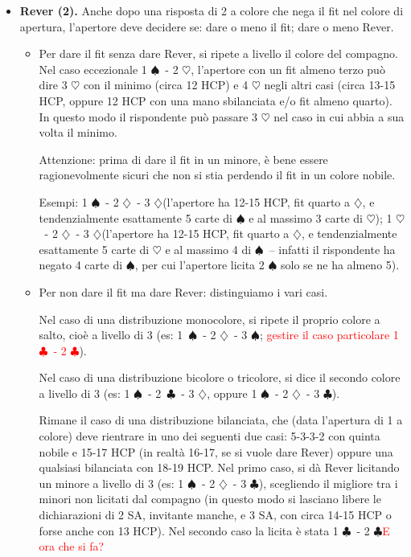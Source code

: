 \documentclass[a4paper,10pt]{article}
\renewcommand{\c}{$\clubsuit$\xspace}
\renewcommand{\d}{$\diamondsuit$\xspace}
\newcommand{\h}{$\heartsuit$\xspace}
\newcommand{\s}{$\spadesuit$\xspace}
\newcommand{\sa}{SA\xspace}
\newcommand{\note}[1]{\textcolor{red}{#1}}
\begin{document}
\begin{itemize}
 Altro esempio: se l'apertore ha meno di 16 HCP, 6 carte di \h e 5 carte di \s, su 1 \h\ - 1 \sa deve rispondere 2 \h e non 2 \s. Questo è un po' triste, però non ci si può fare nulla.
 
 Ulteriore esempio: su 1 \d\ - 1 \s, con la distribuzione 4\d\ - 4\h\ - 3\s\ - 2\c e meno di 16 HCP, l'apertore licita 1 \sa e non 2 \h.
 
 \item {\bf Rever (2).} Anche dopo una risposta di 2 a colore che nega il fit nel colore di apertura, l'apertore deve decidere se: dare o meno il fit; dare o meno Rever.
 \begin{itemize}
  \item Per dare il fit senza dare Rever, si ripete a livello il colore del compagno. Nel caso eccezionale 1 \s\ - 2 \h, l'apertore con un fit almeno terzo può dire 3 \h con il minimo (circa 12 HCP) e 4 \h negli altri casi (circa 13-15 HCP, oppure 12 HCP con una mano sbilanciata e/o fit almeno quarto). In questo modo il rispondente può passare 3 \h nel caso in cui abbia a sua volta il minimo.
  
  Attenzione: prima di dare il fit in un minore, è bene essere ragionevolmente sicuri che non si stia perdendo il fit in un colore nobile.
  
  Esempi: 1 \s\ - 2 \d\ - 3 \d (l'apertore ha 12-15 HCP, fit quarto a \d, e tendenzialmente esattamente 5 carte di \s e al massimo 3 carte di \h);
  1 \h\ - 2 \d\ - 3 \d (l'apertore ha 12-15 HCP, fit quarto a \d, e tendenzialmente esattamente 5 carte di \h e al massimo 4 di \s\ -- infatti il rispondente ha negato 4 carte di \s, per cui l'apertore licita 2 \s solo se ne ha almeno 5).
  
  \item Per non dare il fit ma dare Rever: distinguiamo i vari casi.
  
  Nel caso di una distribuzione monocolore, si ripete il proprio colore a salto, cioè a livello di 3 (es: \mbox{1 \s}\ - 2 \d\ - 3 \s; \note{gestire il caso particolare 1 \c\ - 2 \c}).
  
  Nel caso di una distribuzione bicolore o tricolore, si dice il secondo colore a livello di 3 (es: 1 \s\ - \mbox{2 \c}\ - 3 \d, oppure 1 \s\ - 2 \d\ - 3 \c).
  
  Rimane il caso di una distribuzione bilanciata, che (data l'apertura di 1 a colore) deve rientrare in uno dei seguenti due casi: 5-3-3-2 con quinta nobile e 15-17 HCP (in realtà 16-17, se si vuole dare Rever) oppure una qualsiasi bilanciata con 18-19 HCP. Nel primo caso, si dà Rever licitando un minore a livello di 3 (es: 1 \s\ - 2 \d\ - 3 \c), scegliendo il migliore tra i minori non licitati dal compagno (in questo modo si lasciano libere le dichiarazioni di 2 \sa, invitante manche, e 3 \sa, con circa 14-15 HCP o forse anche con 13 HCP).
  Nel secondo caso la licita è stata 1 \c\ - 2 \c \note{E ora che si fa?}
  

\end{itemize}
\end{itemize}
\end{document}
